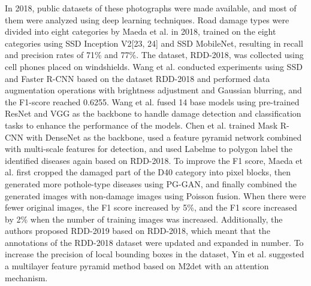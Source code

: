\documentclass[sensors,article,submit,moreauthors]{Definitions/mdpi}
\begin{document}
    In 2018, public datasets of these photographs were made available, and most of them were analyzed using deep learning techniques. Road damage types were divided into eight categories by Maeda et al.\citep{maeda2018road} in 2018, trained on the eight categories using SSD Inception V2[23, 24]\citep{szegedy2016rethinking,liu2016ssd} and SSD MobileNet\citep{howard2017mobilenet}, resulting in recall and precision rates of 71\% and 77\%. The dataset, RDD-2018, was collected using cell phones placed on windshields. Wang et al.\citep{wang2018road} conducted experiments using SSD and Faster R-CNN based on the dataset RDD-2018 and performed data augmentation operations with brightness adjustment and Gaussian blurring, and the F1-score reached 0.6255. Wang et al.\citep{wang2018deep} fused 14 base models using pre-trained ResNet\citep{He_2016_CVPR} and VGG\citep{vgg} as the backbone to handle damage detection and classification tasks to enhance the performance of the models. Chen et al.\citep{chen2020road} trained Mask R-CNN\citep{He_2017_ICCV} with DenseNet\citep{Huang_2017_CVPR} as the backbone, used a feature pyramid network combined with multi-scale features for detection, and used Labelme to polygon label the identified diseases again based on RDD-2018.
    To improve the F1 score, Maeda et al.\citep{maeda2021generative} first cropped the damaged part of the D40 category into pixel blocks, then generated more pothole-type diseases using PG-GAN\citep{karras2018progressive}, and finally combined the generated images with non-damage images using Poisson fusion. When there were fewer original images, the F1 score increased by 5\%, and the F1 score increased by 2\% when the number of training images was increased. Additionally, the authors proposed RDD-2019 based on RDD-2018, which meant that the annotations of the RDD-2018 dataset were updated and expanded in number. To increase the precision of local bounding boxes in the dataset, Yin et al.\citep{yin2021road} suggested a multilayer feature pyramid method based on M2det\citep{zhao2019m2det} with an attention mechanism.
\end{document}
